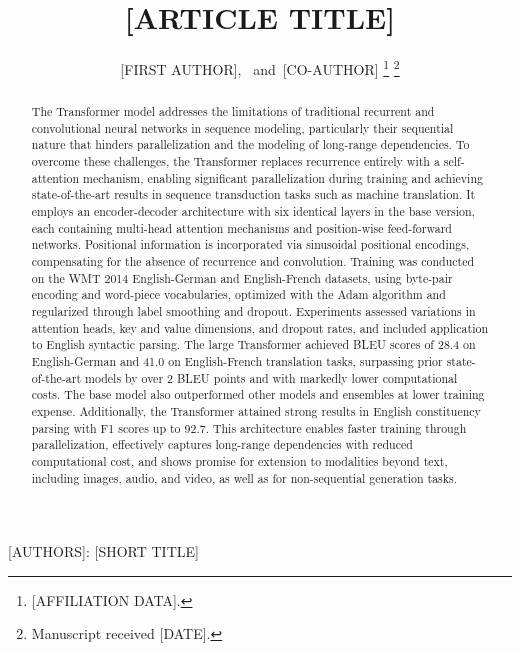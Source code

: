 \documentclass[journal]{IEEEtran}
\begin{document}
\title{[ARTICLE TITLE]}

\author{[FIRST AUTHOR],~
        and~[CO-AUTHOR]%
\thanks{[AFFILIATION DATA].}%
\thanks{Manuscript received [DATE].}}

%
{[AUTHORS]: [SHORT TITLE]}

\maketitle

\begin{abstract}
The Transformer model addresses the limitations of traditional recurrent and convolutional neural networks in sequence modeling, particularly their sequential nature that hinders parallelization and the modeling of long-range dependencies. To overcome these challenges, the Transformer replaces recurrence entirely with a self-attention mechanism, enabling significant parallelization during training and achieving state-of-the-art results in sequence transduction tasks such as machine translation. It employs an encoder-decoder architecture with six identical layers in the base version, each containing multi-head attention mechanisms and position-wise feed-forward networks. Positional information is incorporated via sinusoidal positional encodings, compensating for the absence of recurrence and convolution. Training was conducted on the WMT 2014 English-German and English-French datasets, using byte-pair encoding and word-piece vocabularies, optimized with the Adam algorithm and regularized through label smoothing and dropout. Experiments assessed variations in attention heads, key and value dimensions, and dropout rates, and included application to English syntactic parsing. The large Transformer achieved BLEU scores of 28.4 on English-German and 41.0 on English-French translation tasks, surpassing prior state-of-the-art models by over 2 BLEU points and with markedly lower computational costs. The base model also outperformed other models and ensembles at lower training expense. Additionally, the Transformer attained strong results in English constituency parsing with F1 scores up to 92.7. This architecture enables faster training through parallelization, effectively captures long-range dependencies with reduced computational cost, and shows promise for extension to modalities beyond text, including images, audio, and video, as well as for non-sequential generation tasks.
\end{abstract}
\end{document}

